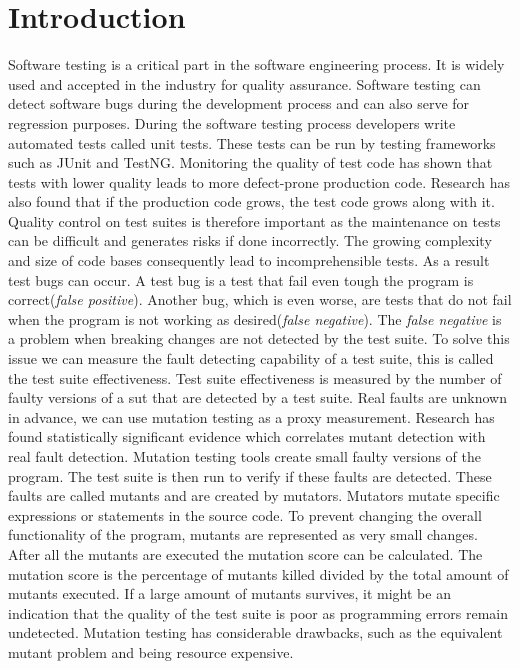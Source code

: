 \documentclass[../main]{subfiles}
\begin{document}
\chapter{Introduction}
\label{ch:introduction}
Software testing is a critical part in the software engineering process. It is widely used and accepted in the industry for quality assurance. 
Software testing can detect software bugs during the development process and can also serve for regression purposes\cite{Bertolino2007SoftwareDreams}. 
During the software testing process developers write automated tests called unit tests. 
These tests can be run by testing frameworks such as JUnit and TestNG\cite{JUnit, TestNG}.
Monitoring the quality of test code has shown that tests with lower quality leads to more defect-prone production code\cite{Spadini2018OnQuality}. 
Research has also found that if the production code grows, the test code grows along with it\cite{Zaidman2008MiningCode}. 
Quality control on test suites is therefore important as the maintenance on tests can be difficult and generates risks if done incorrectly\cite{Horvath2015TestMetrics}.
\newline
The growing complexity and size of code bases consequently lead to incomprehensible tests.
As a result test bugs can occur. 
A test bug is a test that fail even tough the program is correct(\textit{false positive}). 
Another bug, which is even worse, are tests that do not fail when the program is not working as desired(\textit{false negative}).
The \textit{false negative} is a problem when breaking changes are not detected by the test suite.
\newline
To solve this issue we can measure the fault detecting capability of a test suite, this is called the test suite effectiveness.
Test suite effectiveness is measured by the number of faulty versions of a \acrfull{sut} that are detected by a test suite.
Real faults are unknown in advance, we can use mutation testing as a proxy measurement. 
Research has found statistically significant evidence which correlates mutant detection with real fault detection\cite{Just2014AreTesting}.
\newline
{}
Mutation testing tools create small faulty versions of the program.
The test suite is then run to verify if these faults are detected.
These faults are called mutants and are created by mutators.
Mutators mutate specific expressions or statements in the source code. 
To prevent changing the overall functionality of the program, mutants are represented as very small changes\cite{Lipton1978HintsProgrammer}.
\newline
After all the mutants are executed the mutation score can be calculated. 
The mutation score is the percentage of mutants killed divided by the total amount of mutants executed.
If a large amount of mutants survives, it might be an indication that the quality of the test suite is poor as programming errors remain undetected.
Mutation testing has considerable drawbacks\cite{Pizzoleto2019}, such as the equivalent mutant problem and being resource expensive.
\end{document}
